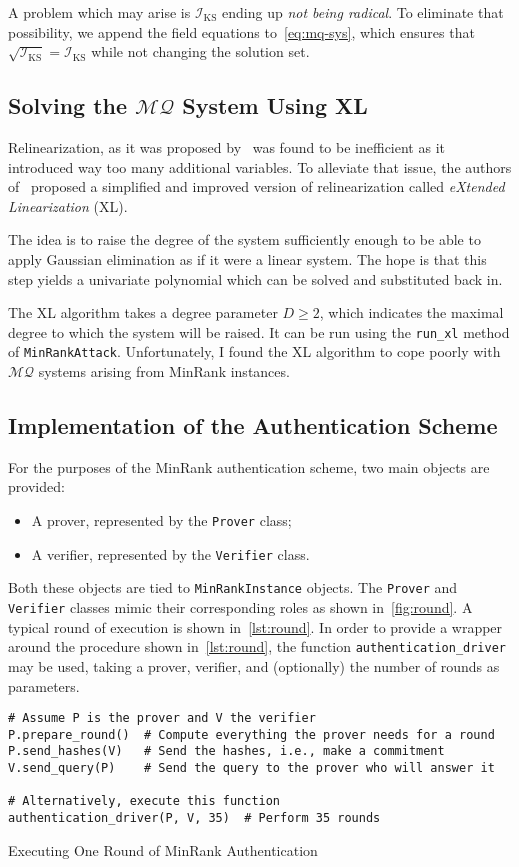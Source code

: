 \documentclass{article}
\theoremstyle{remark}
\theoremstyle{definition}
\theoremstyle{plain}
\newcommand{\MQ}{\ensuremath{\mathcal{MQ}}}
\begin{document}
A problem which may arise is $\mathcal{I}_{\mathrm{KS}}$ ending up \emph{not
  being radical}.  To eliminate that possibility, we append the field equations
to~\eqref{eq:mq-sys}, which ensures that
$\sqrt{\mathcal{I}_{\mathrm{KS}}} = \mathcal{I}_{\mathrm{KS}}$ while not
changing the solution set.

\subsection{Solving the \MQ{} System Using XL}\label{app:solv-xl}
Relinearization, as it was proposed by~\autocite{KS99} was found to be
inefficient as it introduced way too many additional variables.  To alleviate
that issue, the authors of~\autocite{CKPS00} proposed a simplified and improved
version of relinearization called \emph{eXtended Linearization} (XL).

The idea is to raise the degree of the system sufficiently enough to be able to
apply Gaussian elimination as if it were a linear system.  The hope is that this
step yields a univariate polynomial which can be solved and substituted back in.

The XL algorithm takes a degree parameter $D \ge 2$, which indicates the maximal
degree to which the system will be raised.  It can be run using the
\texttt{run\_xl} method of \texttt{MinRankAttack}.  Unfortunately, I found the
XL algorithm to cope poorly with \MQ{} systems arising from MinRank instances.

\subsection{Implementation of the Authentication Scheme}
For the purposes of the MinRank authentication scheme, two main objects are
provided:
\begin{itemize}[noitemsep]
\item A prover, represented by the \texttt{Prover} class;
\item A verifier, represented by the \texttt{Verifier} class.
\end{itemize}

Both these objects are tied to \texttt{MinRankInstance} objects.  The
\texttt{Prover} and \texttt{Verifier} classes mimic their corresponding roles as
shown in~\cref{fig:round}.  A typical round of execution is shown
in~\cref{lst:round}.  In order to provide a wrapper around the procedure shown
in~\cref{lst:round}, the function \texttt{authentication\_driver} may be used,
taking a prover, verifier, and (optionally) the number of rounds as parameters.
\begin{listing}[h]
\begin{verbatim}
# Assume P is the prover and V the verifier
P.prepare_round()  # Compute everything the prover needs for a round
P.send_hashes(V)   # Send the hashes, i.e., make a commitment
V.send_query(P)    # Send the query to the prover who will answer it

# Alternatively, execute this function
authentication_driver(P, V, 35)  # Perform 35 rounds
\end{verbatim}
\caption{Executing One Round of MinRank Authentication}\label{lst:round}
\end{listing}
\end{document}
